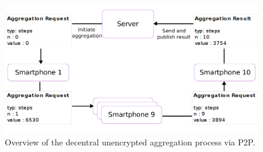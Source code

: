 \begin{figure}[h!]
	\includegraphics[width=\textwidth]{data/diagrams/decentral-aggregation-6.png}
	\caption{Overview of the decentral unencrypted aggregation process via P2P.}
	\label{decentral-aggregation-unencrypted}
\end{figure}

